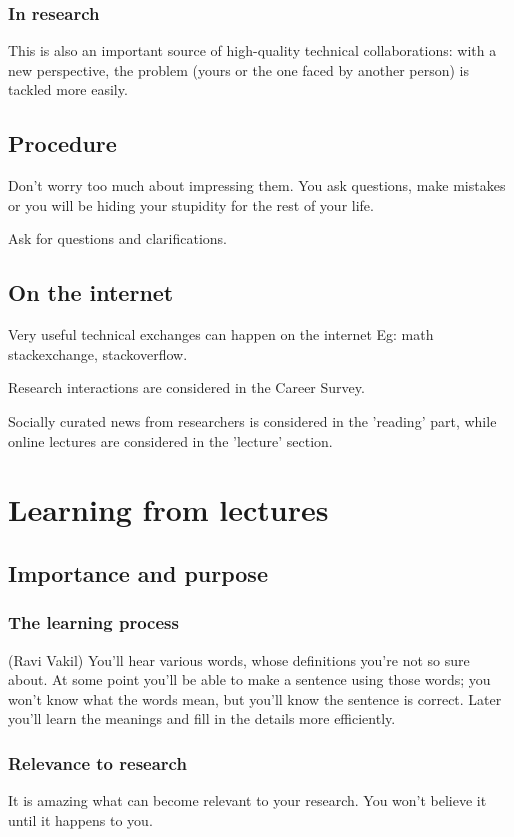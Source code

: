 \documentclass[oneside, article]{memoir}
\begin{document}
\subsubsection{In research}
This is also an important source of high-quality technical collaborations: with a new perspective, the problem (yours or the one faced by another person) is tackled more easily.

\subsection{Procedure}
Don't worry too much about impressing them. You ask questions, make mistakes or you will be hiding your stupidity for the rest of your life.

Ask for questions and clarifications.

\subsection{On the internet}
Very useful technical exchanges can happen on the internet Eg: math stackexchange, stackoverflow.

Research interactions are considered in the Career Survey.

Socially curated news from researchers is considered in the 'reading' part, while online lectures are considered in the 'lecture' section.

\section{Learning from lectures}
\subsection{Importance and purpose}
\subsubsection{The learning process}
(Ravi Vakil) You'll hear various words, whose definitions you're not so sure about. At some point you'll be able to make a sentence using those words; you won't know what the words mean, but you'll know the sentence is correct. Later you'll learn the meanings and fill in the details more efficiently.

\subsubsection{Relevance to research}
It is amazing what can become relevant to your research. You won't believe it until it happens to you.
\end{document}
